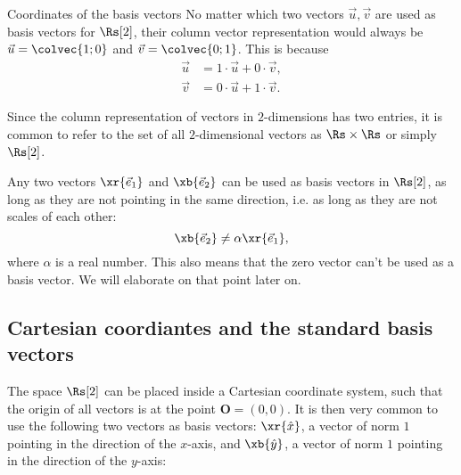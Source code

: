 \begin{note}{Coordinates of the basis vectors}{}
  No matter which two vectors $\vec{u}, \vec{v}$ are used as basis vectors for $\Rs[2]$, their column vector representation would always be $\vec{u}=\colvec{1;0}$ and $\vec{v}=\colvec{0;1}$. This is because
  \begin{align*}
    \vec{u} &= 1\cdot\vec{u}+ 0\cdot\vec{v},\\
    \vec{v} &= 0\cdot\vec{u} + 1\cdot\vec{v}.
  \end{align*}
\end{note}

Since the column representation of vectors in $2$-dimensions has two entries, it is common to refer to the set of all $2$-dimensional vectors as $\Rs\times\Rs$ or simply $\Rs[2]$.

Any two vectors $\xr{\vec{e}_{1}}$ and $\xb{\vec{e}_{2}}$ can be used as basis vectors in $\Rs[2]$, as long as they are not pointing in the same direction, i.e. as long as they are not scales of each other:
\begin{equation}
  \xb{\vec{e}_{2}} \neq \alpha\xr{\vec{e}_{1}},
  \label{eq:basis_vectors_not_scales}
\end{equation}
where $\alpha$ is a real number. This also means that the zero vector can't be used as a basis vector. We will elaborate on that point later on.

\subsection{Cartesian coordiantes and the standard basis vectors}

The space $\Rs[2]$ can be placed inside a Cartesian coordinate system, such that the origin of all vectors is at the point $\bm{O}=(0,0)$. It is then very common to use the following two vectors as basis vectors: $\xr{\hat{x}}$, a vector of norm $1$ pointing in the direction of the $x$-axis, and $\xb{\hat{y}}$, a vector of norm $1$ pointing in the direction of the $y$-axis:

\begin{center}
\end{center}

